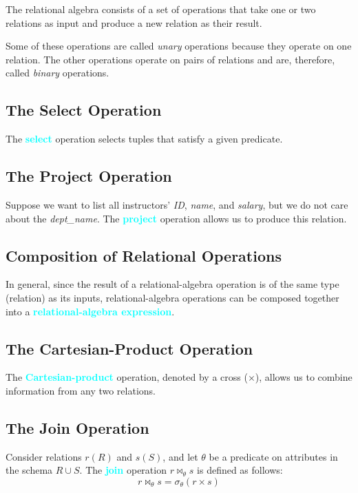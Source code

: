 \documentclass[a4paper,12pt,twoside,openany]{book}
\newcommand{\textcy}[1]{\textbf{\textcolor{cyan}{#1}}}
\begin{document}
The relational algebra consists of a set of operations that take one or two relations as input and produce a new relation as their result.

Some of these operations are called \textit{unary} operations because they operate on one relation. The other operations operate on pairs of relations and are, therefore, called \textit{binary} operations.

\subsection{The Select Operation}

The \textcy{select} operation selects tuples that satisfy a given predicate.

\subsection{The Project Operation}

Suppose we want to list all instructors' \textit{ID}, \textit{name}, and \textit{salary}, but we do not care about the \textit{dept\_name}. The \textcy{project} operation allows us to produce this relation.

\subsection{Composition of Relational Operations}

In general, since the result of a relational-algebra operation is of the same type (relation) as its inputs, relational-algebra operations can be composed together into a \textcy{relational-algebra expression}.

\subsection{The Cartesian-Product Operation}

The \textcy{Cartesian-product} operation, denoted by a cross ($\times$), allows us to combine information from any two relations.

\subsection{The Join Operation}

Consider relations $r(R)$ and $s(S)$, and let $\theta$ be a predicate on attributes in the schema $R\cup S$. The \textcy{join} operation $r\Join_{\theta}s$ is defined as follows: $$r\Join_{\theta}s=\sigma_{\theta}(r\times s)$$
\end{document}
